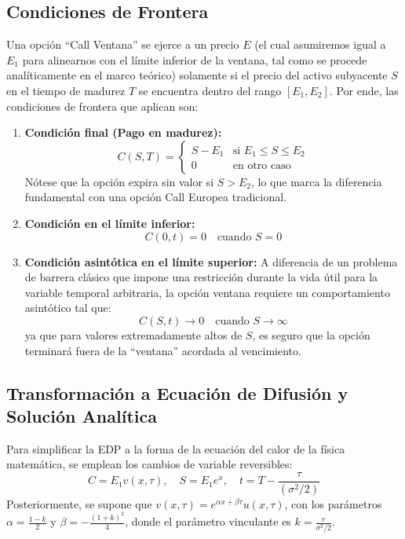 \documentclass[12pt]{article}
\begin{document}
\subsection{Condiciones de Frontera}
Una opción ``Call Ventana'' se ejerce a un precio $E$ (el cual asumiremos igual a $E_1$ para alinearnos con el límite inferior de la ventana, tal como se procede analíticamente en el marco teórico) solamente si el precio del activo subyacente $S$ en el tiempo de madurez $T$ se encuentra dentro del rango $[E_1, E_2]$. Por ende, las condiciones de frontera que aplican son:

\begin{enumerate}
    \item \textbf{Condición final (Pago en madurez):}
    \begin{equation}
    C(S, T) = 
    \begin{cases} 
      S - E_1 & \text{si } E_1 \leq S \leq E_2 \\
      0 & \text{en otro caso}
    \end{cases}
    \end{equation}
    Nótese que la opción expira sin valor si $S > E_2$, lo que marca la diferencia fundamental con una opción Call Europea tradicional.
    \item \textbf{Condición en el límite inferior:}
    \begin{equation}
    C(0, t) = 0 \quad \text{cuando } S = 0
    \end{equation}
    \item \textbf{Condición asintótica en el límite superior:} A diferencia de un problema de barrera clásico que impone una restricción durante la vida útil para la variable temporal arbitraria, la opción ventana requiere un comportamiento asintótico tal que:
    \begin{equation}
    C(S, t) \rightarrow 0 \quad \text{cuando } S \rightarrow \infty
    \end{equation}
    ya que para valores extremadamente altos de $S$, es seguro que la opción terminará fuera de la ``ventana'' acordada al vencimiento.
\end{enumerate}

\subsection{Transformación a Ecuación de Difusión y Solución Analítica}
Para simplificar la EDP a la forma de la ecuación del calor de la física matemática, se emplean los cambios de variable reversibles:
\begin{equation}
C = E_1 v(x, \tau), \quad S = E_1 e^x, \quad t = T - \frac{\tau}{(\sigma^2/2)}
\end{equation}
Posteriormente, se supone que $v(x, \tau) = e^{\alpha x + \beta \tau} u(x, \tau)$, con los parámetros $\alpha = \frac{1 - k}{2}$ y $\beta = -\frac{(1 + k)^2}{4}$, donde el parámetro vinculante es $k = \frac{r}{\sigma^2/2}$.
\end{document}
